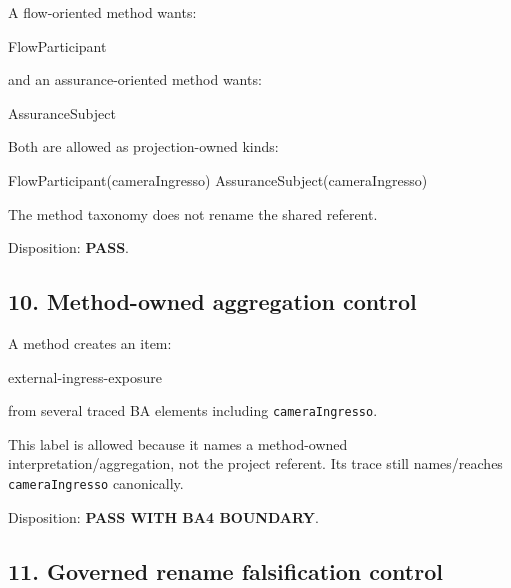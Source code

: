 \documentclass[
  10pt,
  a4paper,
]{article}
\newenvironment{Shaded}{}{}
\newcommand{\NormalTok}[1]{#1}
\begin{document}
A flow-oriented method wants:

\begin{Shaded}
\begin{Highlighting}[]
\NormalTok{FlowParticipant}
\end{Highlighting}
\end{Shaded}

and an assurance-oriented method wants:

\begin{Shaded}
\begin{Highlighting}[]
\NormalTok{AssuranceSubject}
\end{Highlighting}
\end{Shaded}

Both are allowed as projection-owned kinds:

\begin{Shaded}
\begin{Highlighting}[]
\NormalTok{FlowParticipant(cameraIngresso)}
\NormalTok{AssuranceSubject(cameraIngresso)}
\end{Highlighting}
\end{Shaded}

The method taxonomy does not rename the shared referent.

Disposition: \textbf{PASS}.

\subsection{10. Method-owned aggregation
control}\label{method-owned-aggregation-control}

A method creates an item:

\begin{Shaded}
\begin{Highlighting}[]
\NormalTok{external{-}ingress{-}exposure}
\end{Highlighting}
\end{Shaded}

from several traced BA elements including \texttt{cameraIngresso}.

This label is allowed because it names a method-owned
interpretation/aggregation, not the project referent. Its trace still
names/reaches \texttt{cameraIngresso} canonically.

Disposition: \textbf{PASS WITH BA4 BOUNDARY}.

\subsection{11. Governed rename falsification
control}\label{governed-rename-falsification-control}
\end{document}
